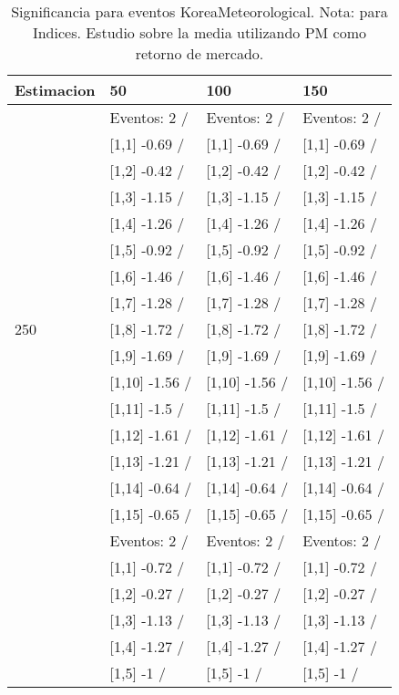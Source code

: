 \begin{table}

\caption{Significancia para eventos KoreaMeteorological. Nota: para Indices. Estudio sobre la media utilizando PM como retorno de mercado.}
\centering
\begin{tabular}[t]{llll}
\toprule
Estimacion & 50 & 100 & 150\\
\midrule
 & Eventos:  2 / & Eventos:  2 / & Eventos:  2 /\\
 & {}[1,1] -0.69  / & {}[1,1] -0.69  / & {}[1,1] -0.69  /\\
 & {}[1,2] -0.42  / & {}[1,2] -0.42  / & {}[1,2] -0.42  /\\
 & {}[1,3] -1.15  / & {}[1,3] -1.15  / & {}[1,3] -1.15  /\\
 & {}[1,4] -1.26  / & {}[1,4] -1.26  / & {}[1,4] -1.26  /\\
\addlinespace
 & {}[1,5] -0.92  / & {}[1,5] -0.92  / & {}[1,5] -0.92  /\\
 & {}[1,6] -1.46  / & {}[1,6] -1.46  / & {}[1,6] -1.46  /\\
 & {}[1,7] -1.28  / & {}[1,7] -1.28  / & {}[1,7] -1.28  /\\
250 & {}[1,8] -1.72  / & {}[1,8] -1.72  / & {}[1,8] -1.72  /\\
 & {}[1,9] -1.69  / & {}[1,9] -1.69  / & {}[1,9] -1.69  /\\
\addlinespace
 & {}[1,10] -1.56  / & {}[1,10] -1.56  / & {}[1,10] -1.56  /\\
 & {}[1,11] -1.5  / & {}[1,11] -1.5  / & {}[1,11] -1.5  /\\
 & {}[1,12] -1.61  / & {}[1,12] -1.61  / & {}[1,12] -1.61  /\\
 & {}[1,13] -1.21  / & {}[1,13] -1.21  / & {}[1,13] -1.21  /\\
 & {}[1,14] -0.64  / & {}[1,14] -0.64  / & {}[1,14] -0.64  /\\
\addlinespace
 & {}[1,15] -0.65  / & {}[1,15] -0.65  / & {}[1,15] -0.65  /\\
 & Eventos:  2 / & Eventos:  2 / & Eventos:  2 /\\
 & {}[1,1] -0.72  / & {}[1,1] -0.72  / & {}[1,1] -0.72  /\\
 & {}[1,2] -0.27  / & {}[1,2] -0.27  / & {}[1,2] -0.27  /\\
 & {}[1,3] -1.13  / & {}[1,3] -1.13  / & {}[1,3] -1.13  /\\
\addlinespace
 & {}[1,4] -1.27  / & {}[1,4] -1.27  / & {}[1,4] -1.27  /\\
 & {}[1,5] -1  / & {}[1,5] -1  / & {}[1,5] -1  /\\

\end{tabular}
\end{table}
